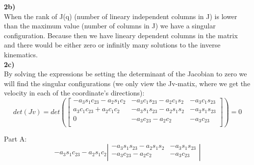 \documentclass[12pt,norsk,a4paper]{article}
\begin{document}
    \newpage
    \textbf{2b)}\\
    When the rank of J(q) (number of lineary independent columns in J) is lower than the maximum value (number of columns in J) we have a singular configuration.
    Because then we have lineary dependent columns in the matrix and there would be either zero or infinitly many solutions to the inverse kinematics.\\

    \textbf{2c)}\\
    By solving the expressions be setting the determinant of the Jacobian to zero we will find the singular configurations (we only view the Jv-matix, where we get the velocity in each of the coordinate's directions):
    \[det(Jv) =det\left( \left[\begin{array}{ccc}
        -a_3s_1c_{23}-a_2s_1c_2 & -a_3c_1s_{23}-a_2c_1s_2 & -a_3c_1s_{23}\\
        a_3c_1c_{23}+a_2c_1c_2 & -a_3s_1s_{23}-a_2s_1s_2 & -a_3s_1s_{23}\\
        0 & -a_3c_{23}-a_2c_2 & -a_3c_{23}\\
    \end{array}\right]\right) = 0\]

    Part A:
    \[-a_3s_1c_{23}-a_2s_1c_2\left|\begin{array}{cc}
        -a_3s_1s_{23}-a_2s_1s_2 & -a_3s_1s_{23}\\
        -a_3c_{23}-a_2c_2 & -a_3c_{23}\\
    \end{array}\right|\]
\end{document}
